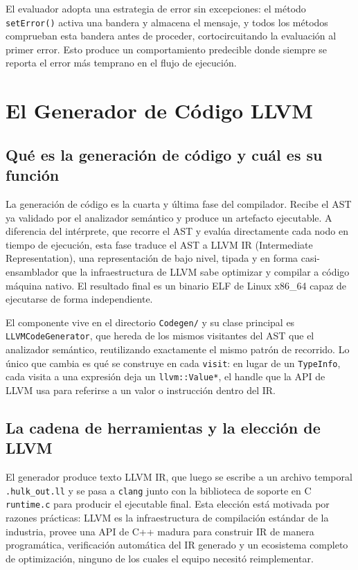 \documentclass[11pt,a4paper]{article}
\begin{document}
El evaluador adopta una estrategia de error sin excepciones: el método \texttt{setError()} activa una bandera y almacena el mensaje, y todos los métodos comprueban esta bandera antes de proceder, cortocircuitando la evaluación al primer error. Esto produce un comportamiento predecible donde siempre se reporta el error más temprano en el flujo de ejecución.

\section{El Generador de Código LLVM}

\subsection{Qué es la generación de código y cuál es su función}

La generación de código es la cuarta y última fase del compilador. Recibe el AST ya validado por el analizador semántico y produce un artefacto ejecutable. A diferencia del intérprete, que recorre el AST y evalúa directamente cada nodo en tiempo de ejecución, esta fase traduce el AST a LLVM IR (Intermediate Representation), una representación de bajo nivel, tipada y en forma casi-ensamblador que la infraestructura de LLVM sabe optimizar y compilar a código máquina nativo. El resultado final es un binario ELF de Linux x86\_64 capaz de ejecutarse de forma independiente.

El componente vive en el directorio \texttt{Codegen/} y su clase principal es \texttt{LLVMCodeGenerator}, que hereda de los mismos visitantes del AST que el analizador semántico, reutilizando exactamente el mismo patrón de recorrido. Lo único que cambia es qué se construye en cada \texttt{visit}: en lugar de un \texttt{TypeInfo}, cada visita a una expresión deja un \texttt{llvm::Value*}, el handle que la API de LLVM usa para referirse a un valor o instrucción dentro del IR.

\subsection{La cadena de herramientas y la elección de LLVM}

El generador produce texto LLVM IR, que luego se escribe a un archivo temporal \texttt{.hulk\_out.ll} y se pasa a \texttt{clang} junto con la biblioteca de soporte en C \texttt{runtime.c} para producir el ejecutable final. Esta elección está motivada por razones prácticas: LLVM es la infraestructura de compilación estándar de la industria, provee una API de C++ madura para construir IR de manera programática, verificación automática del IR generado y un ecosistema completo de optimización, ninguno de los cuales el equipo necesitó reimplementar.
\end{document}
